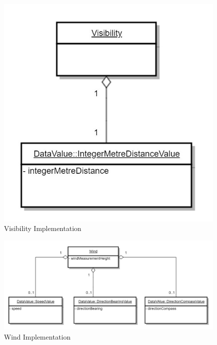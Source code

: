 \begin{figure}
	\begin{center}
		\includegraphics[width=0.65\columnwidth]{images/uml_5_19}
	\end{center}
	\caption{Visibility Implementation}
	\label{fig:app_uml_5_19}
\end{figure}
\begin{figure}
	\begin{center}
		\includegraphics[width=1.1\columnwidth]{images/uml_5_20}
	\end{center}
	\caption{Wind Implementation}
	\label{fig:app_uml_5_20}
\end{figure}
